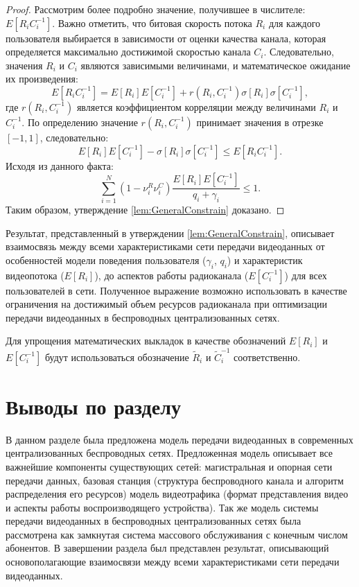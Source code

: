 \begin{proof}
Рассмотрим более подробно значение, получившее в числителе: $E\left[R_{i}C_{i}^{-1}\right]$. Важно отметить, что битовая скорость потока $R_i$ для каждого пользователя выбирается в зависимости от оценки качества канала, которая определяется максимально достижимой скоростью канала $C_i$. Следовательно, значения $R_i$ и $C_i$ являются зависимыми величинами, и математическое ожидание их произведения:
\begin{equation}
	\nonumber
	E\left[R_{i}C_{i}^{-1}\right] = E\left[R_{i}\right]E\left[C_{i}^{-1}\right] + r \left(R_i, C_{i}^{-1}\right) \sigma[R_i]\sigma[C_i^{-1}],
\end{equation}
где $r \left(R_i, C_{i}^{-1}\right)$ является коэффициентом корреляции между величинами $R_i$ и $C_{i}^{-1}$. По определению значение $r \left(R_i, C_{i}^{-1}\right)$ принимает значения в отрезке $[-1, 1]$, следовательно:
\begin{equation}
	\nonumber
	 E\left[R_{i}\right]E\left[C_{i}^{-1}\right] - \sigma[R_i]\sigma[C_i^{-1}] \leq E\left[R_{i}C_{i}^{-1}\right].
\end{equation}
Исходя из данного факта:
\begin{equation}
	\nonumber
	\sum\limits_{i=1}^{N} {\left(1-\nu^R_i\nu^C_i\right)\frac{E[R_i]E[C_i^{-1}]}{q_i + \gamma_i}} \leq 1.
\end{equation}
Таким образом, утверждение \ref{lem:GeneralConstrain} доказано.
\end{proof}

Результат, представленный в утверждении \ref{lem:GeneralConstrain}, описывает взаимосвязь между всеми характеристиками сети передачи видеоданных от особенностей модели поведения пользователя ($\gamma_i$, $q_i$) и характеристик видеопотока ($E[R_i]$), до аспектов работы радиоканала ($E[C_i^{-1}]$) для всех пользователей в сети. Полученное выражение возможно использовать в качестве ограничения на достижимый объем ресурсов радиоканала при оптимизации передачи видеоданных в беспроводных централизованных сетях.

Для упрощения математических выкладок в качестве обозначений $E[R_i]$ и $E[C^{-1}_i]$ будут использоваться обозначение $\tilde{R}_i$ и $\tilde{C}^{-1}_i$ соответственно.

\section{Выводы по разделу}

В данном разделе была предложена модель передачи видеоданных в современных централизованных беспроводных сетях. Предложенная модель описывает все важнейшие компоненты существующих сетей: магистральная и опорная сети передачи данных, базовая станция (структура беспроводного канала и алгоритм распределения его ресурсов) модель видеотрафика (формат представления видео и аспекты работы воспроизводящего устройства). Так же модель системы передачи видеоданных в беспроводных централизованных сетях была рассмотрена как замкнутая система массового обслуживания с конечным числом абонентов. В завершении раздела был представлен результат, описывающий основополагающие взаимосвязи между всеми характеристиками сети передачи видеоданных.

